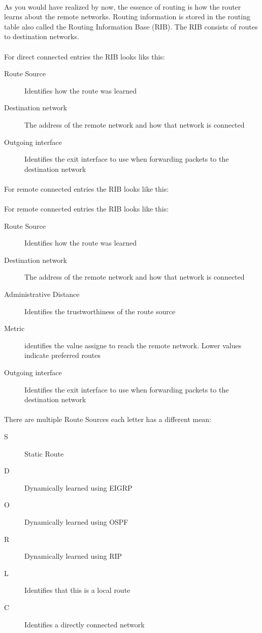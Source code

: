 \documentclass[10pt,landscape]{article}
\begin{document}
\begin{multicols}{3}
\paragraph{}As you would have realized by now, the essence of routing is how the router learns about the remote networks. Routing information is stored in the routing table also called the Routing Information Base (RIB). The RIB consists of routes to destination networks.
\paragraph{}For direct connected entries the RIB looks liks this:
 \begin{description}
	\item[Route Source] Identifies how the route was learned
	\item[Destination network]The address of the remote network and how that network is connected
	\item[Outgoing interface]  Identifies the exit interface to use when forwarding packets to the destination network
\end{description}
\paragraph{}
For remote connected entries the RIB looks like this:
\paragraph{}For remote connected entries the RIB looks like this:
 \begin{description}
	\item[Route Source] Identifies how the route was learned
	\item[Destination network]The address of the remote network and how that network is connected
	\item[Administrative Distance] Identifies the trustworthiness of the route source
	\item[Metric] identifies the value assigne to reach the remote network. Lower values indicate preferred routes
	\item[Outgoing interface]  Identifies the exit interface to use when forwarding packets to the destination network
\end{description}
\paragraph{}
There are multiple Route Sources each letter has a different mean:
\begin{description}
	\item[S] Static Route
	\item[D] Dynamically learned using EIGRP
	\item[O] Dynamically learned using OSPF
	\item[R] Dynamically learned using RIP
	\item[L] Identifies that this is a local route
	\item[C] Identifies a directly connected network
\end{description}

\end{multicols}
\end{document}

